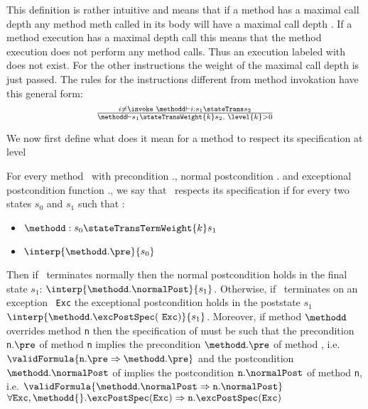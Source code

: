 This definition is rather intuitive and means that if a method \methodd{}
 has a maximal call depth  any method \mbox{\rm meth}  called in its body will have a maximal call depth . 
If a method execution has a maximal depth call  this means that the method execution does not perform any method calls.
Thus an execution labeled with  does not exist.
 For the other instructions the weight of the maximal call depth is just passed. The rules for the instructions different from 
method invokation have this general form: 
$$ \begin{array}{l}
              {\scriptsize \frac{ i \neq \invoke \  \methodd \vdash  i: s_1 \stateTrans s_2 }{ \methodd \vdash s_1 \stateTransWeight{k} s_2 , \  \level{k} > 0}}
\end{array}$$
 
We now first define what does it mean for a method to respect its specification at level 
\begin{defCorrect} \label{defCorrectLevel}
For every method \methodd \ with precondition \methodd.\pre, normal postcondition \methodd.\normalPost
and exceptional postcondition function \methodd.\excPostSpec, we say that \methodd \ respects its specification if 
for every two states $s_0$ and $s_1$ such that :
\begin{itemize}
      
      \item   $\methodd : s_0  \stateTransTermWeight{k} s_1   $
      \item   $ \interp{\methodd.\pre }{ s_0 }$
\end{itemize}
Then if \methodd \ terminates normally then the normal postcondition holds in the final state $s_1 $:  $\interp{\methodd.\normalPost}{s_1}$. 
Otherwise, if  \methodd \ terminates on an exception \mbox{ \rm \texttt{Exc}} the exceptional postcondition holds in the poststate $s_1 $
$ \interp{\methodd.\excPostSpec(  \mbox{ \rm \texttt{Exc}} )}{s_1} $.
 Moreover, if method $\methodd$ overrides method \mbox{\rm\texttt{n}} then the specification of \methodd{} must be such that
 the precondition \mbox{\rm\texttt{n}}.$\pre$ of method  \mbox{\rm\texttt{n}} implies the precondition  $\methodd.\pre$ of method \methodd{}, i.e.
$\validFormula{\mbox{\rm\texttt{n}}.\pre \Rightarrow   \methodd.\pre}$  
and the postcondition 
$\methodd.\normalPost$ of \methodd{} implies the postcondition $\mbox{\rm\texttt{n}}.\normalPost$   of method \mbox{\rm\texttt{n}}, i.e. 
$\validFormula{\methodd.\normalPost \Rightarrow \mbox{\rm\texttt{n}}.\normalPost } $
 $\forall \mbox{\rm\texttt{Exc}} , \methodd{}.\excPostSpec(\mbox{\rm\texttt{Exc}}  )    \Rightarrow \mbox{\rm\texttt{n}}.\excPostSpec(\mbox{\rm\texttt{Exc}}  )$
\end{defCorrect}

